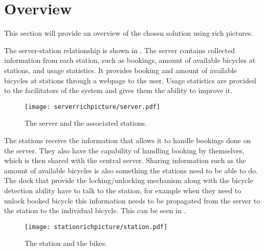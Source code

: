 \section{Overview}
This section will provide an overview of the chosen solution using rich pictures.

The server-station relationship is shown in . 
The server contains collected information from each station, such as bookings, amount of available bicycles at stations, and usage statistics.
It provides booking and amount of available bicycles at stations through a webpage to the user. 
Usage statistics are provided to the facilitators of the system and gives them the ability to improve it. 

\begin{figure}[h]
\centering
\texttt{[image: serverrichpicture/server.pdf]}
\caption{The server and the associated stations.}
\label{fig:ServerRichPicture}
\end{figure}

The stations receive the information that allows it to handle bookings done on the server.
They also have the capability of handling booking by themselves, which is then shared with the central server.
Sharing information such as the amount of available bicycles is also something the stations need to be able to do.
The dock that provide the locking/unlocking mechanism along with the bicycle detection ability have to talk to the station, for example when they need to unlock booked bicycle this information needs to be propagated from the server to the station to the individual bicycle.
This can be seen in .

\begin{figure}[h]
\centering
\texttt{[image: stationrichpicture/station.pdf]}
\caption{The station and the bikes.}
\label{fig:StationRichPicture}
\end{figure}

\begin{comment}
\begin{figure}[h]
\centering
\begin{subfigure}[b]{0.3\textwidth}
\centering
\texttt{[image: Bicyclewithlock/bicylewithlock.pdf]}
\caption{Locked bicycle.}
\label{fig:BicycleLocked}
\end{subfigure}
~
\begin{subfigure}[b]{0.3\textwidth}
\centering
\texttt{[image: Bicyclewithoutlock/bicylewithoutlock.pdf]}
\caption{Unlocked bicycle.}
\label{fig:BicycleUnlocked}
\end{subfigure}
\caption{Rich picture of bicycle.}
\label{fig:Bicycles}
\end{figure}
\end{comment}